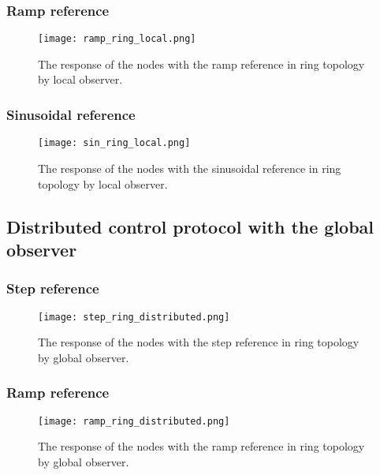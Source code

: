 \subsubsection{Ramp reference}
\begin{figure}[H] %
    \centering
    \texttt{[image: ramp\_ring\_local.png]} %
    \caption{The response of the nodes with the ramp reference in ring topology by local observer.}
\end{figure}

\subsubsection{Sinusoidal reference}
\begin{figure}[H] %
    \centering
    \texttt{[image: sin\_ring\_local.png]} %
    \caption{The response of the nodes with the sinusoidal reference in ring topology by local observer.}
\end{figure}



\subsection{Distributed control protocol with the global observer}
\subsubsection{Step reference}
\begin{figure}[H] %
    \centering
    \texttt{[image: step\_ring\_distributed.png]} %
    \caption{The response of the nodes with the step reference in ring topology by global observer.}
\end{figure}

\subsubsection{Ramp reference}
\begin{figure}[H] %
    \centering
    \texttt{[image: ramp\_ring\_distributed.png]} %
    \caption{The response of the nodes with the ramp reference in ring topology by global observer.}
\end{figure}


